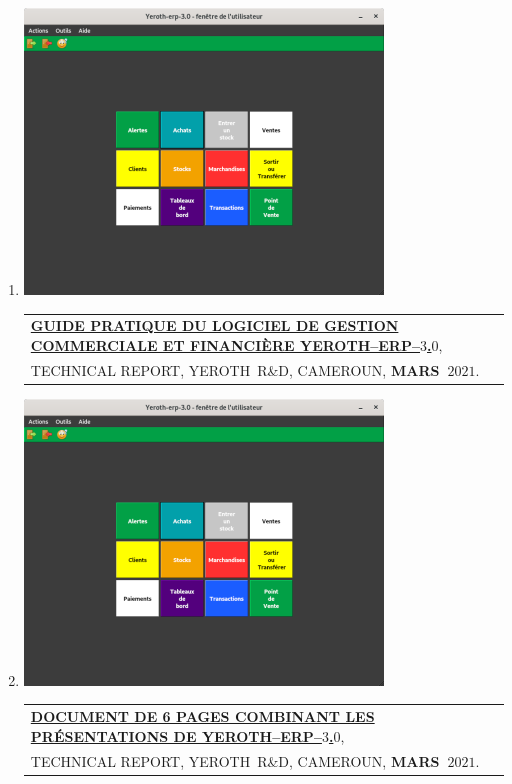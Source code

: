 \documentclass[9pt,a4paper]{article} %
\makeatletter
\newcommand{\yerothrd}{YEROTH~R\&D\xspace}
\newcommand{\headerrow}[2]
{\begin{tabular*}{\linewidth}{l@{\extracolsep{\fill}}r}
	#1 &
	#2 \\
\end{tabular*}}
\newcommand{\headerrowONE}[1]{\headerrow{#1}{}}
\newcommand{\yerothitem}[1]
{
	\item \includegraphics[scale=0.03]{yeroth-erp-3-0.png} #1
}
\newcommand{\yerotherptroispointzero}{YEROTH--ERP--$3$.$0$\xspace}
\makeatother
\begin{document}
\begin{enumerate}
	\yerothitem
	 \headerrowONE{\href{http://archive.org/download/yeroth-erp-3-0-software-system-uses/yeroth-erp-3-0-software-system-uses.pdf}
	{\textbf{GUIDE PRATIQUE DU LOGICIEL DE GESTION COMMERCIALE ET FINANCIÈRE \yerotherptroispointzero}},\\
		TECHNICAL REPORT, \yerothrd, CAMEROUN, \textbf{MARS~$2021$}.}					
						
	\yerothitem
	 \headerrowONE{\href{http://archive.org/download/yeroth-erp-3-0-info-francais_202104/yeroth-erp-3-0-info-francais.pdf}
	{\textbf{DOCUMENT DE 6 PAGES COMBINANT LES PRÉSENTATIONS DE \yerotherptroispointzero}},\\
		TECHNICAL REPORT, \yerothrd, CAMEROUN, \textbf{MARS~$2021$}.}	
 
\end{enumerate}
\end{document}
